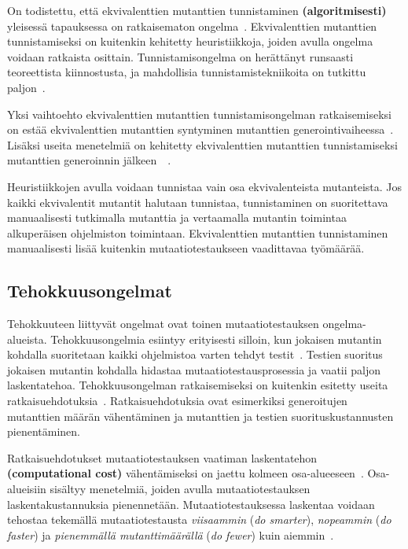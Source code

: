 \documentclass[finnish, grading]{tktltiki2}
\theoremstyle{definition}
\theoremstyle{remark}
\begin{document}
\vspace{1\baselineskip}On todistettu, että ekvivalenttien mutanttien tunnistaminen \textbf{(algoritmisesti)} yleisessä tapauksessa on ratkaisematon ongelma~\cite[s. 79]{Offutt:Ma:Kwon:2006:MuClassLevel}. Ekvivalenttien mutanttien tunnistamiseksi on kuitenkin kehitetty heuristiikkoja, joiden avulla ongelma voidaan ratkaista osittain. Tunnistamisongelma on herättänyt runsaasti teoreettista kiinnostusta, ja mahdollisia tunnistamistekniikoita on tutkittu paljon~\cite[s. 657]{Jia:Harman:2011}. 

Yksi vaihtoehto ekvivalenttien mutanttien tunnistamisongelman ratkaisemiseksi on estää ekvivalenttien mutanttien syntyminen mutanttien generointivaiheessa~\cite[s. 80]{Offutt:Ma:Kwon:2006:MuClassLevel}. Lisäksi useita menetelmiä on kehitetty ekvivalenttien mutanttien tunnistamiseksi mutanttien generoinnin jälkeen~\cite[s. 79]{Offutt:Ma:Kwon:2006:MuClassLevel}~\cite[s. 657]{Jia:Harman:2011}.

Heuristiikkojen avulla voidaan tunnistaa vain osa ekvivalenteista mutanteista. Jos kaikki ekvivalentit mutantit halutaan tunnistaa, tunnistaminen on suoritettava manuaalisesti tutkimalla mutanttia ja vertaamalla mutantin toimintaa alkuperäisen ohjelmiston toimintaan. Ekvivalenttien mutanttien tunnistaminen manuaalisesti lisää kuitenkin mutaatiotestaukseen vaadittavaa työmäärää.

\subsection{Tehokkuusongelmat}

Tehokkuuteen liittyvät ongelmat ovat toinen mutaatiotestauksen ongelma-alueista. Tehokkuusongelmia esiintyy erityisesti silloin, kun jokaisen mutantin kohdalla suoritetaan kaikki ohjelmistoa varten tehdyt testit~\cite[s. 652]{Jia:Harman:2011}. Testien suoritus jokaisen mutantin kohdalla hidastaa mutaatiotestausprosessia ja vaatii paljon laskentatehoa. Tehokkuusongelman ratkaisemiseksi on kuitenkin esitetty useita ratkaisuehdotuksia~\cite[s. 653]{Jia:Harman:2011}. Ratkaisuehdotuksia ovat esimerkiksi generoitujen mutanttien määrän vähentäminen ja mutanttien ja testien suorituskustannusten pienentäminen.

Ratkaisuehdotukset mutaatiotestauksen vaatiman laskentatehon \textbf{(computational cost)} vähentämiseksi on jaettu kolmeen osa-alueeseen~\cite[s. 37]{Offutt:Untch:2001}. Osa-alueisiin sisältyy menetelmiä, joiden avulla mutaatiotestauksen laskentakustannuksia pienennetään. Mutaatiotestauksessa laskentaa voidaan tehostaa tekemällä mutaatiotestausta \textit{viisaammin} (\textit{do smarter}), \textit{nopeammin} (\textit{do faster}) ja \textit{pienemmällä mutanttimäärällä} (\textit{do fewer}) kuin aiemmin~\cite[s. 37]{Offutt:Untch:2001}.
\end{document}
